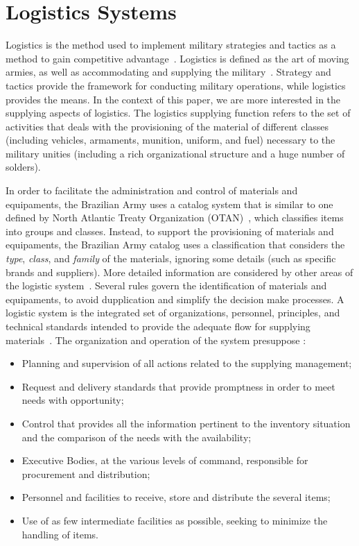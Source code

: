 \section{Logistics Systems}

Logistics is the method used to implement military strategies and tactics as a method to gain 
competitive advantage~\cite{rutner2012}. Logistics is defined as the art of moving armies, 
as well as accommodating and supplying the military~\cite{prebilic2006}. Strategy and tactics 
provide the framework for conducting military operations, while logistics provides the means.
In the context of this paper, we are more interested in the supplying aspects of logistics. 
The logistics supplying function refers to the set of activities that deals with the  provisioning of 
the material of different classes (including vehicles, armaments, munition, uniform, and fuel) necessary to the 
military unities (including a rich organizational structure and a huge number of solders). 

In order to facilitate the administration and control of materials and equipaments, the Brazilian Army uses a 
catalog system that is similar to one defined by North Atlantic Treaty Organization (OTAN)~\cite{otan2012}, 
which classifies items into groups and classes. Instead, to support the provisioning of materials and equipaments, 
the Brazilian Army catalog uses a classification that considers the \emph{type}, \emph{class}, and \emph{family} of the 
materials, ignoring some details (such as specific brands and suppliers). More detailed information are considered by 
other areas of the logistic system~\cite{brasil2003}. Several rules govern the identification of materials and equipaments, 
to avoid dupplication and simplify the decision make processes. 
A logistic system is the integrated set of organizations, personnel, principles, and technical standards intended to provide 
the adequate flow for supplying materials~\cite{brasil2003}. The organization and operation of the system 
presuppose \cite{brasil2003}:

\begin{itemize}
\item Planning and supervision of all actions related to the supplying management;
\item Request and delivery standards that provide promptness in order to meet needs with opportunity;
\item Control that provides all the information pertinent to the inventory situation and the comparison of the needs with the availability;
\item Executive Bodies, at the various levels of command, responsible for procurement and distribution;
\item Personnel and facilities to receive, store and distribute the several items;
\item Use of as few intermediate facilities as possible, seeking to minimize the handling of items.
\end{itemize}

